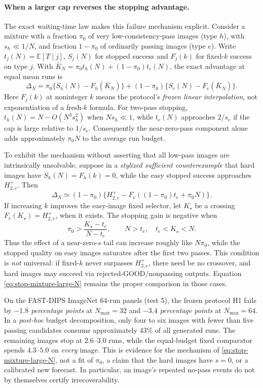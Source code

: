 \paragraph{When a larger cap reverses the stopping advantage.}
The exact waiting-time law makes this failure mechanism explicit.
Consider a mixture with a fraction $\pi_0$ of very
low-consistency-pass images (type $h$), with $s_h\ll 1/N$,
and fraction $1-\pi_0$ of ordinarily passing images (type $e$).
Write $t_j(N)=\mathbb E[T\mid j]$, $S_j(N)$ for stopped
success and $F_j(k)$ for fixed-$k$ success on type $j$.
With $\bar K_N=\pi_0t_h(N)+(1-\pi_0)t_e(N)$,
the exact advantage at equal mean runs is
\begin{equation}\label{eq:stop-mixture-large-N}
 \Delta_N =
 \pi_0\{S_h(N)-F_h(\bar K_N)\}
 +(1-\pi_0)\{S_e(N)-F_e(\bar K_N)\}.
\end{equation}
Here $F_j(k)$ at noninteger $k$ means the protocol's
\emph{frozen linear interpolation}, not exponentiation
of a fresh-$k$ formula.
For two-pass stopping, $t_h(N)=N-O(N^3s_h^2)$
when $Ns_h\ll1$, while $t_e(N)$ approaches
$2/s_e$ if the cap is large relative to $1/s_e$.
Consequently the near-zero-pass component alone adds
approximately $\pi_0N$ to the average run budget.

To exhibit the mechanism without asserting that all low-pass
images are intrinsically unsolvable, suppose in a
\emph{stylized sufficient counterexample} that hard images
have $S_h(N)=F_h(k)=0$, while the easy stopped
success approaches $H^+_{2,e}$.
Then
\[
 \Delta_N\simeq (1-\pi_0)
 \{H^+_{2,e}-F_e((1-\pi_0)t_e+\pi_0N)\}.
\]
If increasing $k$ improves the easy-image fixed selector,
let $K_\star$ be a crossing
$F_e(K_\star)=H^+_{2,e}$, when it exists.
The stopping gain is negative when
\begin{equation}\label{eq:stop-pi0-crossing}
  \pi_0>\frac{K_\star-t_e}{N-t_e},
  \qquad N>t_e,\quad t_e<K_\star<N.
\end{equation}
Thus the effect of a near-zero-$s$ tail can increase
roughly like $N\pi_0$, while the
stopped quality on easy images saturates after the first
two passes. This condition is \emph{not} universal:
if fixed-$k$ never surpasses $H^+_{2,e}$, there
need be no crossover, and hard images may succeed via
rejected-GOOD/nonpassing outputs. Equation
\eqref{eq:stop-mixture-large-N} remains the proper
comparison in those cases.

On the FAST-DIPS ImageNet 64-run panels (test 5),
the frozen protocol H1 fails by \emph{$-1.8$ percentage points}
at $N_{\max}=32$ and \emph{$-3.4$ percentage points} at
$N_{\max}=64$. In a \emph{post-hoc}
budget decomposition, only four to six images
with fewer than five passing candidates consume
approximately $43\%$ of all generated runs.
The remaining images stop at $2.6$--$3.0$ runs,
while the equal-budget fixed comparator spends
$4.3$--$5.0$ on \emph{every} image.
This is evidence for the mechanism of
\eqref{eq:stop-mixture-large-N}, not a fit of
$\pi_0$, a claim that the hard images have $s=0$,
or a calibrated new forecast.
In particular, an image's repeated no-pass events
do not by themselves certify irrecoverability.

